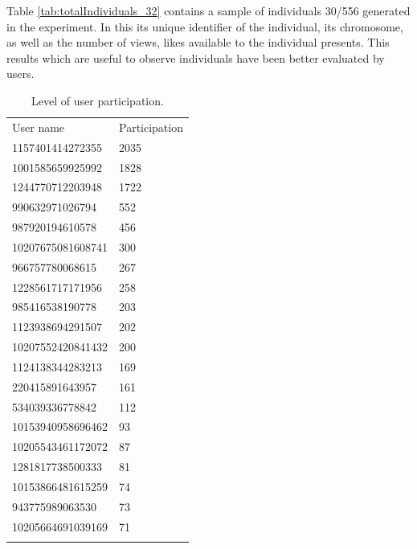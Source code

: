 Table \ref{tab:totalIndividuals_32} contains a sample of individuals 30/556
generated in the experiment. In this its unique identifier of the individual,
its chromosome, as well as the number of views, likes available to the
individual presents. This results which are useful to observe individuals have
been better evaluated by users.

\begin{table}
\small
\caption{Level of user participation.}
\label{tab:userParticipation_22}
\centering
\small
\begin{tabular}{p{4cm} p{4cm}}
\hline\noalign{\smallskip}
 User name & Participation   \\
\noalign{\smallskip}\hline\noalign{\smallskip}
\small{1157401414272355} & \small{2035} \\ \hline
\small{1001585659925992} & \small{1828} \\ \hline
\small{1244770712203948} & \small{1722} \\ \hline
\small{990632971026794} & \small{552} \\ \hline
\small{987920194610578} & \small{456} \\ \hline
\small{10207675081608741} & \small{300} \\ \hline
\small{966757780068615} & \small{267} \\ \hline
\small{1228561717171956} & \small{258} \\ \hline
\small{985416538190778} & \small{203} \\ \hline
\small{1123938694291507} & \small{202} \\ \hline
\small{10207552420841432} & \small{200} \\ \hline
\small{1124138344283213} & \small{169} \\ \hline
\small{220415891643957} & \small{161} \\ \hline
\small{534039336778842} & \small{112} \\ \hline
\small{10153940958696462} & \small{93} \\ \hline
\small{10205543461172072} & \small{87} \\ \hline
\small{1281817738500333} & \small{81} \\ \hline
\small{10153866481615259} & \small{74} \\ \hline
\small{943775989063530} & \small{73} \\ \hline
\small{10205664691039169} & \small{71} \\ \hline


\noalign{\smallskip}\hline
\end{tabular}
\end{table}

